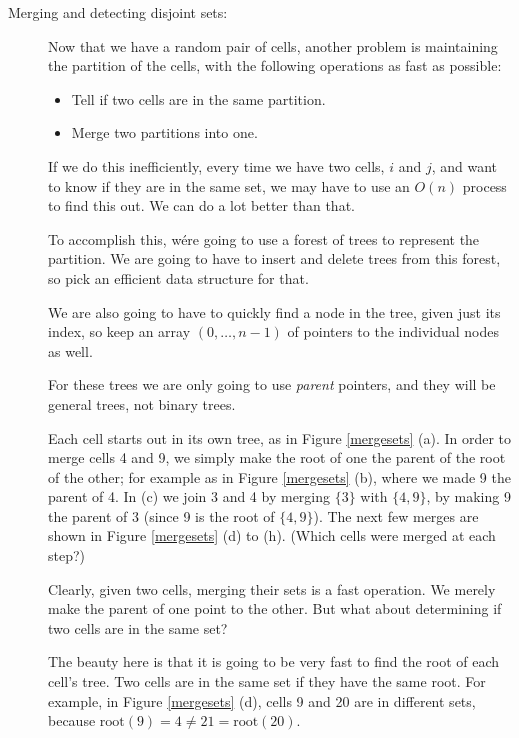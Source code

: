 \documentclass{article}
\newcommand{\set}[1]{\ensuremath{\{#1\}}}
\begin{document}
\begin{description}
\item[Merging  and detecting disjoint sets:]
  
Now that we have a random pair of cells, another problem is maintaining
the partition of the cells, with the following operations as fast as
possible: 
  \begin{itemize}
  \item Tell if two cells are in the same partition.
    \item Merge two partitions into one.
  \end{itemize}

If we do this inefficiently, every time we have two cells, $i$ and
$j$, and want to know if they are in the same set, we may have to use
an $O(n)$ process to find this out.  We can do a lot better than that.

  To accomplish this, wére going to use a forest of trees to represent
  the partition.  We are going to have to insert and delete trees from
  this forest, so pick an efficient data structure for that.

  We are also going to have to quickly find a node in the tree, given
  just its index, so keep an array $(0,\ldots,n-1)$ of pointers to the
  individual nodes as well.

For these trees we are only going to use {\em parent} pointers, and
they will be general trees, not binary trees.

  Each cell starts out in its own tree, as in Figure \ref{mergesets}
  (a).  In order to merge cells 4 and 9, we simply make the root of one
  the parent of the root of the other; for example as in Figure
  \ref{mergesets} (b), where we made 9 the parent of 4.  In (c) we
  join 3 and 4 by 
  merging \set{3} with \set{4,9}, by making 9 the parent of 3 (since 9
  is the root of \set{4,9}).
  The next few merges are shown in Figure
  \ref{mergesets} (d) to (h).  (Which cells were merged at each step?)

Clearly, given two cells, merging their sets is a fast operation.  We
merely make the parent of one point to the other.  But what about
determining if two cells are in the same set?

The beauty here is that it is going to be very fast to find the root
of each cell's tree.  Two cells are in the same set if they have the
same root.  For example, in Figure \ref{mergesets} (d), cells 9 and 20
are in different sets, because $\mbox{root}(9) = 4 \not =
21 = \mbox{root}(20) $.




\end{description}
\end{document}

